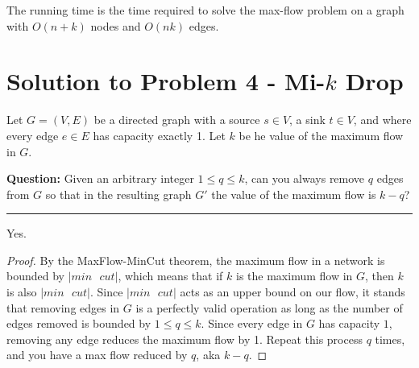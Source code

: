 \documentclass[11pt]{article}
\begin{document}
The running time is the time required to solve the max-flow problem on a graph with $O(n+k)$ nodes and $O(nk)$ edges.

\pagebreak

\section*{Solution to Problem 4 - Mi-$k$ Drop}

Let $G = (V,E)$ be a directed graph with a source $s \in V$, a sink $t \in V$, and where every edge $e \in E$ has capacity exactly 1. Let $k$ be he value of the maximum flow in $G$.

\textbf{Question:} Given an arbitrary integer $1 \leq q \leq k$, can you always remove $q$ edges from $G$ so that in the resulting graph $G'$ the value of the maximum flow is $k-q$?

\noindent\rule{17cm}{0.4pt}

Yes.

\begin{proof}
By the MaxFlow-MinCut theorem, the maximum flow in a network is bounded by $|min\text{ }cut|$, which means that if $k$ is the maximum flow in $G$, then $k$ is also $|min\text{ }cut|$. Since $|min\text{ }cut|$ acts as an upper bound on our flow, it stands that removing edges in $G$ is a perfectly valid operation as long as the number of edges removed is bounded by $1 \leq q \leq k$. Since every edge in $G$ has capacity $1$, removing any edge  reduces the maximum flow by 1. Repeat this process $q$ times, and you have a max flow reduced by $q$, aka $k-q$.
\end{proof} 
\end{document}
